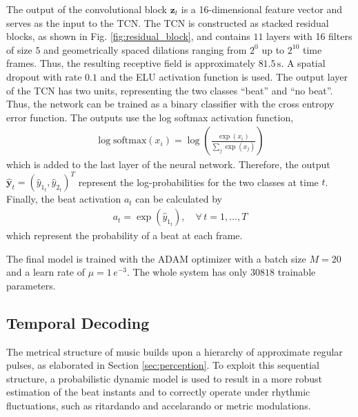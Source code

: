 \documentclass{scrartcl}
\begin{document}
The output of the convolutional block $\mathbf z_t$ is a 16-dimensional feature vector and serves as the input to the TCN. The TCN is constructed as stacked residual blocks, as shown in Fig. \ref{fig:residual_block}, and contains $11$ layers with 16 filters of size $5$ and geometrically spaced di\-lations ranging from $2^0$ up to $2^{10}$ time frames. Thus, the resulting receptive field is approximately $81.5\,\text{s}$. A spatial dropout with rate $0.1$ and the ELU activation function is used. The output layer of the TCN has two units, representing the two classes ``beat'' and ``no beat''. Thus, the network can be trained as a binary classifier with the cross entropy error function. The outputs use the log softmax activation function, 
\begin{align}
\log \text{softmax}(x_i) = \log\left(\frac{\exp{(x_i)}}{\sum_j \exp(x_j)}\right)
\end{align} 
which is added to the last layer of the neural network. Therefore, the output $\hat{\mathbf y}_t = (\hat{y}_{1_t}, \hat{y}_{2_t})^T$ represent the log-probabilities for the two classes at time $t$. Finally, the beat activation $a_t$ can be calculated by
\begin{align}
a_t = \exp \left({\hat{y}_{1_t}} \right), \quad \forall \, t= 1,\dots,T
\end{align}  
which represent the probability of a beat at each frame.

The final model is trained with the ADAM optimizer \cite{Kingma2014} with a batch size $M = 20$ and a learn rate of $\mu = 1 \,e^{-3}$. The whole system has only $30818$ trainable parameters. 



\subsection{Temporal Decoding}
\label{sec:temporal_decoding}

The metrical structure of music builds upon a hierarchy of approximate regular pulses, as elaborated in Section \ref{sec:perception}. To exploit this sequential structure, a probabilistic dynamic model is used to result in a more robust estimation of the beat instants and to correctly operate under rhythmic fluctuations, such as ritardando and accelarando or metric modulations.
\end{document}
